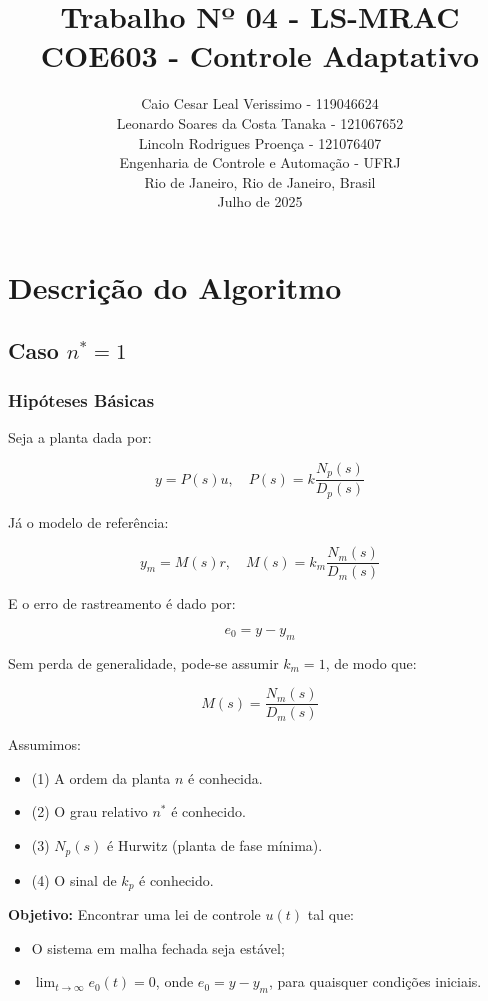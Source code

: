 \documentclass[10pt]{article}
\title{
    Trabalho Nº 04 - LS-MRAC \\
    \large COE603 - Controle Adaptativo
}
\author{
    Caio Cesar Leal Verissimo - 119046624 \\
    Leonardo Soares da Costa Tanaka - 121067652 \\
    Lincoln Rodrigues Proença - 121076407 \\
    Engenharia de Controle e Automação - UFRJ \\
    Rio de Janeiro, Rio de Janeiro, Brasil \\
    Julho de 2025
}
\date{}
\begin{document}
\maketitle

\tableofcontents
\newpage

\section{Descrição do Algoritmo}

\subsection{Caso \( n^* = 1 \)}

\subsubsection{Hipóteses Básicas}

Seja a planta dada por:

\[
y = P(s)u, \quad P(s) = k \frac{N_p(s)}{D_p(s)}
\]

Já o modelo de referência:

\[
y_m = M(s)r, \quad M(s) = k_m \frac{N_m(s)}{D_m(s)}
\]

E o erro de rastreamento é dado por:

\[
e_0 = y - y_m
\]

Sem perda de generalidade, pode-se assumir \( k_m = 1 \), de modo que:

\[
M(s) = \frac{N_m(s)}{D_m(s)}
\]

Assumimos:
\begin{itemize}
    \item (1) A ordem da planta \( n \) é conhecida.
    \item (2) O grau relativo \( n^* \) é conhecido.
    \item (3) \( N_p(s) \) é Hurwitz (planta de fase mínima).
    \item (4) O sinal de \( k_p \) é conhecido.
\end{itemize}

\textbf{Objetivo:} Encontrar uma lei de controle \( u(t) \) tal que:
\begin{itemize}
    \item O sistema em malha fechada seja estável;
    \item \( \lim_{t \to \infty} e_0(t) = 0 \), onde \( e_0 = y - y_m \), para quaisquer condições iniciais.
\end{itemize}
\end{document}
